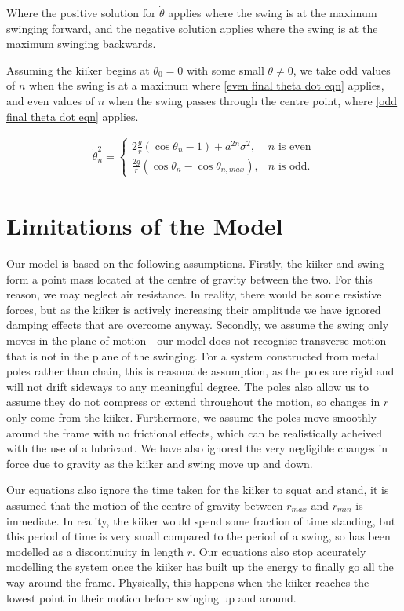 \documentclass[12pt]{article}
\begin{document}
Where the positive solution for $\dot{\theta}$ applies where the swing is at the maximum swinging forward, and the negative solution applies where the swing is at the maximum swinging backwards.

Assuming the kiiker begins at $\theta_0 = 0$ with some small $\dot{\theta} \neq 0$, we take odd values of $n$ when the swing is at a maximum where \ref{even final theta dot eqn} applies, and even values of $n$ when the swing passes through the centre point, where \ref{odd final theta dot eqn} applies.

\begin{align}
\dot{\theta}_n^2 = 
    \begin{cases}
        2\frac{g}{r}(\cos{\theta}_{n}-1) +a^{2n}\sigma^2 , & n \text{ is even}\\
        \frac{2g}{r}(\cos{\theta_{n}}-\cos{\theta_{n,max}}), & n \text{ is odd}.
    \end{cases}
\end{align}

\section{Limitations of the Model}

Our model is based on the following assumptions.
Firstly, the kiiker and swing form a point mass located at the centre of gravity between the two. For this reason, we may neglect air resistance. In reality, there would be some resistive forces, but as the kiiker is actively increasing their amplitude we have ignored damping effects that are overcome anyway.
Secondly, we assume the swing only moves in the plane of motion - our model does not recognise transverse motion that is not in the plane of the swinging. For a system constructed from metal poles rather than chain, this is reasonable assumption, as the poles are rigid and will not drift sideways to any meaningful degree. The poles also allow us to assume they do not compress or extend throughout the motion, so changes in $r$ only come from the kiiker. Furthermore, we assume the poles move smoothly around the frame with no frictional effects, which can be realistically acheived with the use of a lubricant. We have also ignored the very negligible changes in force due to gravity as the kiiker and swing move up and down.

Our equations also ignore the time taken for the kiiker to squat and stand, it is assumed that the motion of the centre of gravity between $r_{max}$ and $r_{min}$ is immediate. In reality, the kiiker would spend some fraction of time standing, but this period of time is very small compared to the period of a swing, so has been modelled as a discontinuity in length $r$.
Our equations also stop accurately modelling the system once the kiiker has built up the energy to finally go all the way around the frame. Physically, this happens when the kiiker reaches the lowest point in their motion before swinging up and around.
\end{document}
